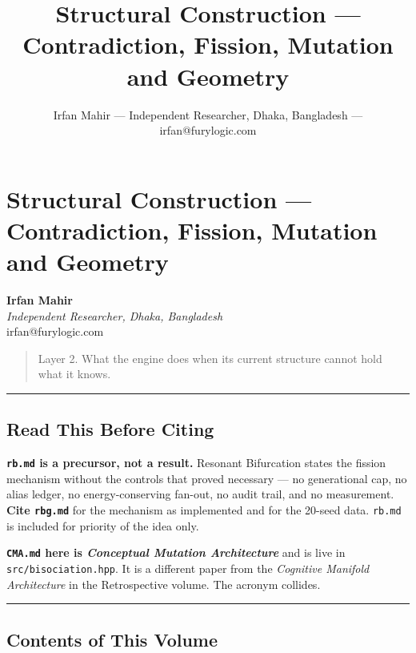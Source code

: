 \documentclass[
  11pt,
  a4paper,
]{article}
\title{Structural Construction --- Contradiction, Fission, Mutation and
Geometry}
\author{Irfan Mahir --- Independent Researcher, Dhaka, Bangladesh ---
irfan@furylogic.com}
\date{}
\begin{document}
\maketitle

{
\hypersetup{linkcolor=}
\setcounter{tocdepth}{2}
\tableofcontents
}
\section{Structural Construction --- Contradiction, Fission, Mutation
and
Geometry}\label{structural-construction-contradiction-fission-mutation-and-geometry}

\textbf{Irfan Mahir}\\
\emph{Independent Researcher, Dhaka, Bangladesh}\\
irfan@furylogic.com

\begin{quote}
Layer 2. What the engine does when its current structure cannot hold
what it knows.
\end{quote}

\begin{center}\rule{0.5\linewidth}{0.5pt}\end{center}

\subsection{Read This Before Citing}\label{read-this-before-citing}

\textbf{\texttt{rb.md} is a precursor, not a result.} Resonant
Bifurcation states the fission mechanism without the controls that
proved necessary --- no generational cap, no alias ledger, no
energy-conserving fan-out, no audit trail, and no measurement.
\textbf{Cite \texttt{rbg.md}} for the mechanism as implemented and for
the 20-seed data. \texttt{rb.md} is included for priority of the idea
only.

\textbf{\texttt{CMA.md} here is \emph{Conceptual Mutation Architecture}}
and is live in \texttt{src/bisociation.hpp}. It is a different paper
from the \emph{Cognitive Manifold Architecture} in the Retrospective
volume. The acronym collides.

\begin{center}\rule{0.5\linewidth}{0.5pt}\end{center}

\subsection{Contents of This Volume}\label{contents-of-this-volume}
\end{document}
